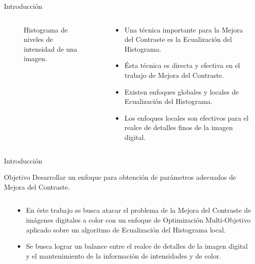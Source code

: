 \documentclass[usenames,dvipsnames]{beamer}
\begin{document}
\begin{frame}{Introducción}

\begin{columns}[t]
\begin{column}{.45\textwidth}
\begin{figure}[H]
\caption{Histograma de niveles de intensidad de una imagen.}
\end{figure}
\end{column}
\begin{column}{.55\textwidth}
\begin{itemize}
	\item Una técnica importante para la Mejora del Contraste es la Ecualización del Histograma.
	\item Ésta técnica es directa y efectiva en el trabajo de Mejora del Contraste.
	\item Existen enfoques globales y locales de Ecualización del Histograma.
	\item Los enfoques locales son efectivos para el realce de detalles finos de la imagen digital.
\end{itemize}
\end{column}
\end{columns}


\end{frame}


\begin{frame}{Introducción}
\vspace{-0.5cm}
\begin{alertblock}{Objetivo}
Desarrollar un enfoque para obtención de parámetros adecuados de Mejora del Contraste.
\end{alertblock}
\vspace{-0.2cm}
\begin{columns}[t]
\begin{column}{.3\textwidth}

\end{column}
\begin{column}{.7\textwidth}
\begin{itemize}
	\item En éste trabajo se busca atacar el problema de la Mejora del Contraste de imágenes digitales a color con un enfoque de Optimización Multi-Objetivo aplicado sobre un algoritmo de Ecualización del Histograma local.
	\item Se busca lograr un balance entre el realce de detalles de la imagen digital y el mantenimiento de la información de intensidades y de color.
\end{itemize}
\end{column}
\end{columns}


\end{frame}
\end{document}
